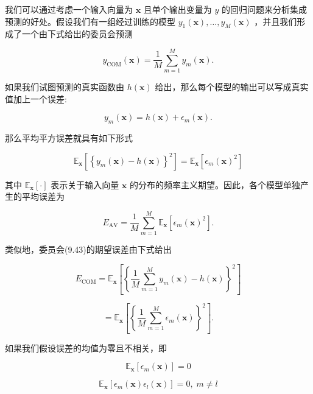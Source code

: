 \documentclass[10pt]{report}
\begin{document}
我们可以通过考虑一个输入向量为 \(\mathbf{x}\) 且单个输出变量为 \(y\) 的回归问题来分析集成预测的好处。假设我们有一组经过训练的模型 \({y}_{1}\left( \mathbf{x}\right) ,\ldots ,{y}_{M}\left( \mathbf{x}\right)\) ，并且我们形成了一个由下式给出的委员会预测

\[
{y}_{\mathrm{{COM}}}\left( \mathbf{x}\right)  = \frac{1}{M}\mathop{\sum }\limits_{{m = 1}}^{M}{y}_{m}\left( \mathbf{x}\right) . \tag{9.43}
\]

如果我们试图预测的真实函数由 \(h\left( \mathbf{x}\right)\) 给出，那么每个模型的输出可以写成真实值加上一个误差:

\[
{y}_{m}\left( \mathbf{x}\right)  = h\left( \mathbf{x}\right)  + {\epsilon }_{m}\left( \mathbf{x}\right) . \tag{9.44}
\]

那么平均平方误差就具有如下形式

\[
{\mathbb{E}}_{\mathbf{x}}\left\lbrack  {\left\{  {y}_{m}\left( \mathbf{x}\right)  - h\left( \mathbf{x}\right) \right\}  }^{2}\right\rbrack   = {\mathbb{E}}_{\mathbf{x}}\left\lbrack  {{\epsilon }_{m}{\left( \mathbf{x}\right) }^{2}}\right\rbrack   \tag{9.45}
\]

其中 \({\mathbb{E}}_{\mathbf{x}}\left\lbrack  \cdot \right\rbrack\) 表示关于输入向量 \(\mathbf{x}\) 的分布的频率主义期望。因此，各个模型单独产生的平均误差为

\[
{E}_{\mathrm{{AV}}} = \frac{1}{M}\mathop{\sum }\limits_{{m = 1}}^{M}{\mathbb{E}}_{\mathbf{x}}\left\lbrack  {{\epsilon }_{m}{\left( \mathbf{x}\right) }^{2}}\right\rbrack  . \tag{9.46}
\]

类似地，委员会(9.43)的期望误差由下式给出

\[
{E}_{\mathrm{{COM}}} = {\mathbb{E}}_{\mathbf{x}}\left\lbrack  {\left\{  \frac{1}{M}\mathop{\sum }\limits_{{m = 1}}^{M}{y}_{m}\left( \mathbf{x}\right)  - h\left( \mathbf{x}\right) \right\}  }^{2}\right\rbrack
\]

\[
= {\mathbb{E}}_{\mathbf{x}}\left\lbrack  {\left\{  \frac{1}{M}\mathop{\sum }\limits_{{m = 1}}^{M}{\epsilon }_{m}\left( \mathbf{x}\right) \right\}  }^{2}\right\rbrack  . \tag{9.47}
\]

如果我们假设误差的均值为零且不相关，即

\[
{\mathbb{E}}_{\mathbf{x}}\left\lbrack  {{\epsilon }_{m}\left( \mathbf{x}\right) }\right\rbrack   = 0 \tag{9.48}
\]

\[
{\mathbb{E}}_{\mathbf{x}}\left\lbrack  {{\epsilon }_{m}\left( \mathbf{x}\right) {\epsilon }_{l}\left( \mathbf{x}\right) }\right\rbrack   = 0,\;m \neq  l \tag{9.49}
\]
\end{document}
